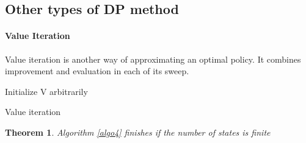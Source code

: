 \documentclass[14pt,a4paper]{article}
\newtheorem{theorem}{Theorem}
\theoremstyle{definition}
\begin{document}
\subsection{Other types of DP method}

\paragraph{Value Iteration}
Value iteration is another way of approximating an optimal policy. It combines improvement and evaluation in each of its sweep.

\begin{algorithm}[H]
    \label{algo4}
    
	    
    Initialize V arbitrarily 
    

    
\caption{Value iteration}
\end{algorithm}



\begin{theorem}
Algorithm \ref{algo4} finishes if the number of states is finite 
\end{theorem}
\end{document}
